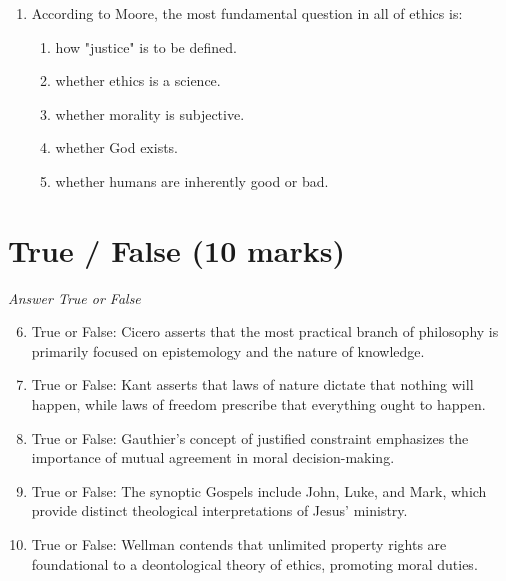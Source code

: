 \documentclass[12pt]{article}
\begin{document}
\begin{enumerate}[label=\arabic*.]
\begin{enumerate}[label=(\alph*)]
    \item Wealth and prosperity
    \item Fear and obedience
    \item Knowledge and education
    \item Power and influence
    \item Truth and love
\end{enumerate}
\item According to Moore, the most fundamental question in all of ethics is:
\begin{enumerate}[label=(\alph*)]
    \item how "justice" is to be defined.
    \item whether ethics is a science.
    \item whether morality is subjective.
    \item whether God exists.
    \item whether humans are inherently good or bad.
\end{enumerate}
\end{enumerate}

\section*{True / False (10 marks)}
\textit{Answer True or False}
\begin{enumerate}[label=\arabic*.]
\setcounter{enumi}{5}
\item True or False: Cicero asserts that the most practical branch of philosophy is primarily focused on epistemology and the nature of knowledge.
\item True or False: Kant asserts that laws of nature dictate that nothing will happen, while laws of freedom prescribe that everything ought to happen.
\item True or False: Gauthier's concept of justified constraint emphasizes the importance of mutual agreement in moral decision-making.
\item True or False: The synoptic Gospels include John, Luke, and Mark, which provide distinct theological interpretations of Jesus' ministry.
\item True or False: Wellman contends that unlimited property rights are foundational to a deontological theory of ethics, promoting moral duties.
\end{enumerate}
\end{document}
